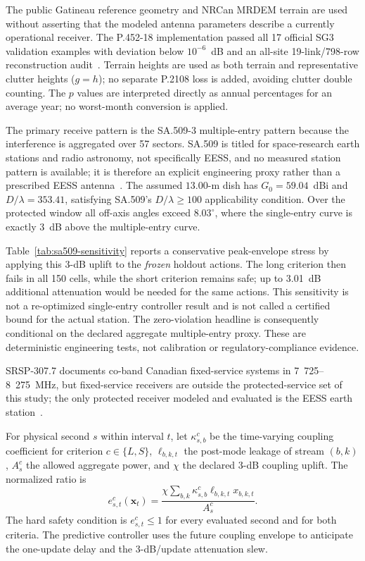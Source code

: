 \documentclass[journal]{IEEEtran}
\begin{document}
The public Gatineau reference geometry and NRCan MRDEM terrain are used without asserting that the modeled antenna parameters describe a currently operational receiver. The P.452-18 implementation passed all 17 official SG3 validation examples with deviation below $10^{-6}$~dB and an all-site 19-link/798-row reconstruction audit~\cite{iturp452,iturp452validation}. Terrain heights are used as both terrain and representative clutter heights ($g=h$); no separate P.2108 loss is added, avoiding clutter double counting. The $p$ values are interpreted directly as annual percentages for an average year; no worst-month conversion is applied.

The primary receive pattern is the SA.509-3 multiple-entry pattern because the interference is aggregated over 57 sectors. SA.509 is titled for space-research earth stations and radio astronomy, not specifically EESS, and no measured station pattern is available; it is therefore an explicit engineering proxy rather than a prescribed EESS antenna~\cite{itursa509}. The assumed $13.00$-m dish has $G_0=59.04$~dBi and $D/\lambda=353.41$, satisfying SA.509's $D/\lambda\ge100$ applicability condition. Over the protected window all off-axis angles exceed $8.03^\circ$, where the single-entry curve is exactly 3~dB above the multiple-entry curve.

Table~\ref{tab:sa509-sensitivity} reports a conservative peak-envelope stress by applying this 3-dB uplift to the \emph{frozen} holdout actions. The long criterion then fails in all 150 cells, while the short criterion remains safe; up to 3.01~dB additional attenuation would be needed for the same actions. This sensitivity is not a re-optimized single-entry controller result and is not called a certified bound for the actual station. The zero-violation headline is consequently conditional on the declared aggregate multiple-entry proxy. These are deterministic engineering tests, not calibration or regulatory-compliance evidence.

SRSP-307.7 documents co-band Canadian fixed-service systems in 7~725--8~275~MHz, but fixed-service receivers are outside the protected-service set of this study; the only protected receiver modeled and evaluated is the EESS earth station~\cite{ised3077}.



For physical second $s$ within interval $t$, let $\kappa^{c}_{s,b}$ be the time-varying coupling coefficient for criterion $c\in\{L,S\}$, $\ell_{b,k,t}$ the post-mode leakage of stream $(b,k)$, $A^{c}_{s}$ the allowed aggregate power, and $\chi$ the declared 3-dB coupling uplift. The normalized ratio is
\begin{equation}
 e^{c}_{s,t}(\bm x_t)=
 \frac{\chi\sum_{b,k}\kappa^{c}_{s,b}\ell_{b,k,t}x_{b,k,t}}
 {A^{c}_{s}}.
 \label{eq:eess}
\end{equation}
The hard safety condition is $e^{c}_{s,t}\le 1$ for every evaluated second and for both criteria. The predictive controller uses the future coupling envelope to anticipate the one-update delay and the 3-dB/update attenuation slew.
\end{document}
